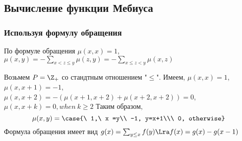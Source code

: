 \documentclass[unicode,10pt]{article}
\begin{document}
\subsection{Вычисление функции Мебиуса}
\subsubsection{Используя формулу обращения}
По формуле обращения $\mu(x,x) =1$, $\displaystyle \mu(x,y) = -\sum_{x<z\le y}\mu(z,y) =-\sum_{x\le z<y}\mu(x,z)$
\begin{ex}
  Возьмем $P=\Z_+$ со стандтным отношением "$\le$". Имеем,
  $\mu(x,x) =1$, $\mu(x,x+1)=-1$, $\mu(x,x+2) = -(\mu(x+1,x+2) + \mu(x+2,x+2)) = 0$,
  $\mu(x,x+k) = 0, when\  k\ge 2$\WHY
  Таким образом,
  \begin{displaymath}
    \mu(x,y) = \case{\ 1,\  x =y\\ -1, y=x+1\\\ 0, otherwise}
  \end{displaymath}
  Формула обращения имеет вид
  $g(x) = \sum_{y\le x}f(y) \Lra f(x)=g(x) - g(x-1)$
\end{ex}
\end{document}
